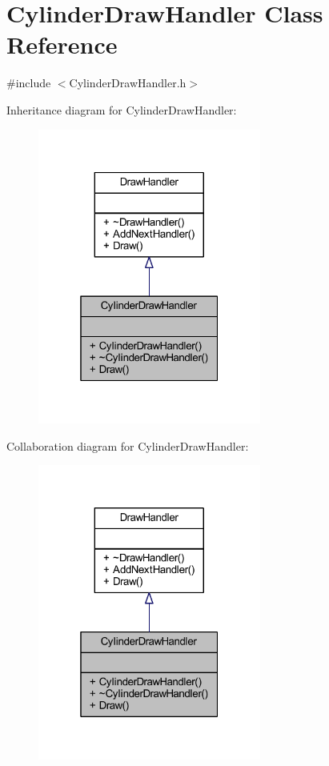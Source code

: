 \hypertarget{class_cylinder_draw_handler}{}\section{Cylinder\+Draw\+Handler Class Reference}
\label{class_cylinder_draw_handler}


{\ttfamily \#include $<$Cylinder\+Draw\+Handler.\+h$>$}



Inheritance diagram for Cylinder\+Draw\+Handler\+:
\nopagebreak
\begin{figure}[H]
\begin{center}
\leavevmode
\includegraphics[width=208pt]{class_cylinder_draw_handler__inherit__graph}
\end{center}
\end{figure}


Collaboration diagram for Cylinder\+Draw\+Handler\+:
\nopagebreak
\begin{figure}[H]
\begin{center}
\leavevmode
\includegraphics[width=208pt]{class_cylinder_draw_handler__coll__graph}
\end{center}
\end{figure}
